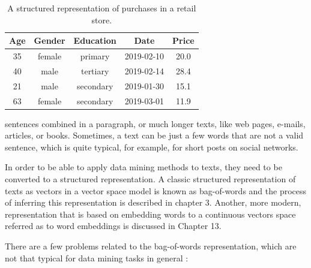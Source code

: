 \begin{table}[H]
\centering
\caption{A structured representation of purchases in a retail store.}
\label{tab:purchases}
\begin{tabular}{ccccc}
\toprule
\textbf{Age} & \textbf{Gender} & \textbf{Education} & \textbf{Date} & \textbf{Price} \\
\midrule
35 & female & primary & 2019-02-10 & 20.0 \\
40 & male & tertiary & 2019-02-14 & 28.4 \\
21 & male & secondary & 2019-01-30 & 15.1 \\
63 & female & secondary & 2019-03-01 & 11.9 \\
\bottomrule
\end{tabular}
\end{table}
\hspace{-1.5em}sentences combined in a paragraph, or much longer texts, like web pages, e-mails, articles, or books. Sometimes, a text can be just a few words that are not a valid sentence, which is quite typical, for example, for short posts on social networks.

In order to be able to apply data mining methods to texts, they need to be
converted to a structured representation. A classic structured representation of
texts as vectors in a vector space model is known as bag-of-words and the process
of inferring this representation is described in chapter 3. Another, more modern,
representation that is based on embedding words to a continuous vectors space
referred as to word embeddings is discussed in Chapter 13.

There are a few problems related to the bag-of-words representation, which
are not that typical for data mining tasks in general \cite{ref134,ref65,ref188,ref170,ref202}:


